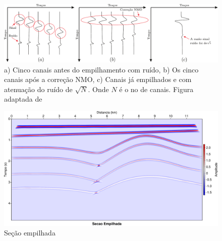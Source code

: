 \begin{figure}[H]
\centering
\includegraphics[width=16cm]{figuras/cap2/empilhamento.pdf}
\caption{a) Cinco canais antes do empilhamento com ruído, b) Os cinco canais após a correção NMO, c) Canais já empilhados e com atenuação do ruído de $\sqrt{N}$. Onde $N$ é o no de canais. Figura adaptada de \citep{Vasconcellos(2009)}}
\label{fig:empilhamento}
\end{figure}

\begin{landscape}
\begin{figure}[H]
\centering
\includegraphics[totalheight=14cm]{figuras/cap2/seis_stack.pdf}
\caption{Seção empilhada}
\label{fig:seis_stack}
\end{figure}
\end{landscape}
